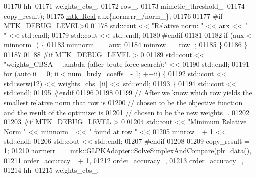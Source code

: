 \begin{DoxyCode}
{{01170                                                           hh,
01171                                                           weights\_cbs\_,
01172                                                           row\_,
01173                                                           mimetic\_threshold\_,
01174                                                           copy\_result);
01175       \hyperlink{group__c01-roots_gac080bbbf5cbb5502c9f00405f894857d}{mtk::Real} aux\{normerr\_/norm\_\};
01176 
01177 \textcolor{preprocessor}{      #if MTK\_DEBUG\_LEVEL>0}
01178       std::cout << \textcolor{stringliteral}{"Relative norm: "} << aux << \textcolor{stringliteral}{" "} << std::endl;
01179       std::cout << std::endl;
01180 \textcolor{preprocessor}{      #endif}
01181 
01182       \textcolor{keywordflow}{if} (aux < minnorm\_) \{
01183         minnorm\_ = aux;
01184         minrow\_= row\_;
01185       \}
01186     \}
01187 
01188 \textcolor{preprocessor}{    #if MTK\_DEBUG\_LEVEL > 0}
01189     std::cout << \textcolor{stringliteral}{"weights\_CBSA + lambda (after brute force search):"} <<
01190       std::endl;
01191     \textcolor{keywordflow}{for} (\textcolor{keyword}{auto} ii = 0; ii < num\_bndy\_coeffs\_ - 1; ++ii) \{
01192       std::cout << std::setw(12) << weights\_cbs\_[ii] << std::endl;
01193     \}
01194     std::cout << std::endl;
01195 \textcolor{preprocessor}{    #endif}
01196 
01198 
01199     \textcolor{comment}{// After we know which row yields the smallest relative norm that row is}
01200     \textcolor{comment}{// chosen to be the objective function and the result of the optimizer is}
01201     \textcolor{comment}{// chosen to be the new weights\_.}
01202 
01203 \textcolor{preprocessor}{    #if MTK\_DEBUG\_LEVEL > 0}
01204     std::cout << \textcolor{stringliteral}{"Minimum Relative Norm "} << minnorm\_ << \textcolor{stringliteral}{" found at row "} <<
01205       minrow\_ + 1 << std::endl;
01206     std::cout << std::endl;
01207 \textcolor{preprocessor}{    #endif}
01208 
01209     copy\_result = 1;
01210     normerr\_ = \hyperlink{classmtk_1_1GLPKAdapter_a834480aca83e3c0d09fdab7fdb7e8a3f}{mtk::GLPKAdapter::SolveSimplexAndCompare}(phi.
      \hyperlink{classmtk_1_1DenseMatrix_a0c33b8a9e01d157c61ddbdf807c25d84}{data}(),
01211                                                         order\_accuracy\_ + 1,
01212                                                         order\_accuracy\_,
01213                                                         order\_accuracy\_,
01214                                                         hh,
01215                                                         weights\_cbs\_,
}}
\end{DoxyCode}
